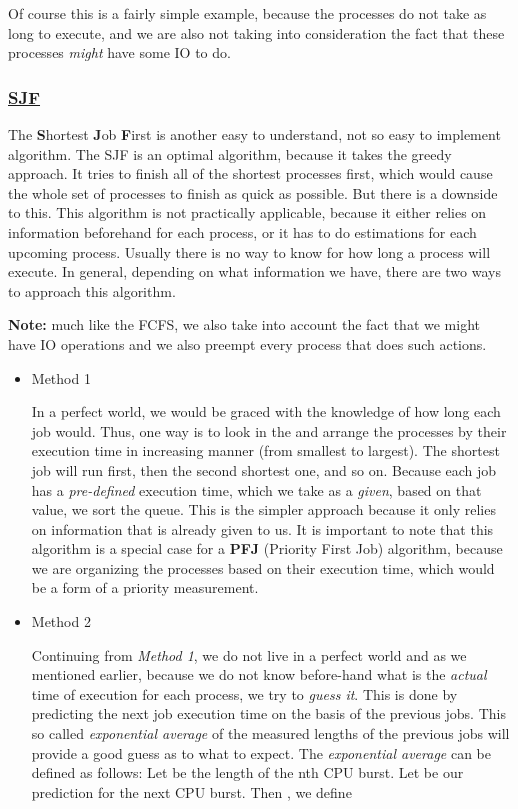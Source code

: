 \documentclass{article}
\newcommand{\code}[1]{\codeinline{\texttt{#1}}}
\begin{document}
Of course this is a fairly simple example, because the processes do not take as long to execute, and we are also not taking into consideration the fact that these processes \textit{might} have some IO to do.

\subsubsection{\underline{SJF}}

The \textbf{S}hortest \textbf{J}ob \textbf{F}irst is another easy to understand, not so easy to implement algorithm. The SJF is an optimal algorithm, because it takes the greedy approach. It tries to finish all of the shortest processes first, which would cause the whole set of processes to finish as quick as possible. But there is a downside to this. This algorithm is not practically applicable, because it either relies on information beforehand for each process, or it has to do estimations for each upcoming process. Usually there is no way to know for how long a process will execute. In general, depending on what information we have, there are two ways to approach this algorithm.

\textbf{Note:} much like the FCFS, we also take into account the fact that we might have IO operations and we also preempt every process that does such actions.


\begin{itemize}
\item Method 1

In a perfect world, we would be graced with the knowledge of how long each job would. Thus, one way is to look in the \code{ready\_queue} and arrange the processes by their execution time in increasing manner (from smallest to largest). The shortest job will run first, then the second shortest one, and so on. Because each job has a \textit{pre-defined} execution time, which we take as a \textit{given}, based on that value, we sort the queue. This is the simpler approach because it only relies on information that is already given to us. It is important to note that this algorithm is a special case for a \textbf{PFJ} (Priority First Job) algorithm, because we are organizing the processes based on their execution time, which would be a form of a priority measurement.

\item Method 2

Continuing from \textit{Method 1}, we do not live in a perfect world and as we mentioned earlier, because we do not know before-hand what is the \textit{actual} time of execution for each process, we try to \textit{guess it}. This is done by predicting the next job execution time on the basis of the previous jobs. This so called \textit{exponential average} of the measured lengths of the previous jobs will provide a good guess as to what to expect. The \textit{exponential average} can be defined as follows: Let  be the length of the nth CPU burst. Let  be our prediction for the next CPU burst. Then , we define
\end{itemize}
\end{document}
